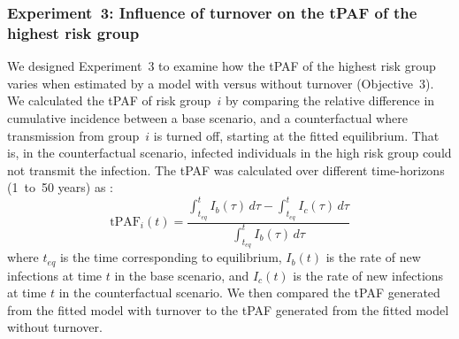 \subsubsection{Experiment~3: Influence of turnover on the tPAF of the highest risk group}
\label{sss:exp-tpaf}
We designed Experiment~3 to examine how the tPAF of the
highest risk group varies when estimated
by a model with versus without turnover (Objective~3).
We calculated the tPAF of risk group~$i$ by comparing
the relative difference in cumulative incidence between
a base scenario, and a counterfactual where transmission from group~$i$ is turned off,
starting at the fitted equilibrium.
That is, in the counterfactual scenario,
infected individuals in the high risk group could not transmit the infection.
The tPAF was calculated over different time-horizons (1~to~50 years) as
\citep{Mishra2014}:
\begin{equation}
\textrm{tPAF}_i(t) =
  \frac{\displaystyle\int_{t_{eq}}^{t} I_b(\tau) \, d\tau -
        \displaystyle\int_{t_{eq}}^{t} I_c(\tau) \, d\tau}
       {\displaystyle\int_{t_{eq}}^{t} I_b(\tau) \, d\tau}
\end{equation}
where $t_{eq}$ is the time corresponding to equilibrium,
$I_b(t)$ is the rate of new infections at time $t$ in the base scenario,
and $I_c(t)$ is the rate of new infections at time $t$ in the counterfactual scenario.
We then compared the tPAF generated from the fitted model with turnover
to the tPAF generated from the fitted model without turnover.
